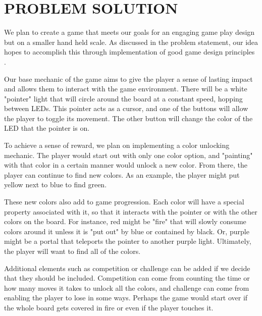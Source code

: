 \documentclass[12pt]{article}
\begin{document}
\section{PROBLEM SOLUTION}

We plan to create a game that meets our goals for an engaging game play design but on a smaller hand held scale. As discussed in the problem statement, our idea hopes to accomplish this through implementation of good game design principles \cite{designPrinciples}\cite{youtube}.

Our base mechanic of the game aims to give the player a sense of lasting impact and allows them to interact with the game environment. There will be a white "pointer" light that will circle around the board at a constant speed, hopping between LEDs. This pointer acts as a cursor, and one of the buttons will allow the player to toggle its movement. The other button will change the color of the LED that the pointer is on.

To achieve a sense of reward, we plan on implementing a color unlocking mechanic. The player would start out with only one color option, and "painting" with that color in a certain manner would unlock a new color. From there, the player can continue to find new colors. As an example, the player might put yellow next to blue to find green.

These new colors also add to game progression. Each color will have a special property associated with it, so that it interacts with the pointer or with the other colors on the board. For instance, red might be "fire" that will slowly consume colors around it unless it is "put out" by blue or contained by black. Or, purple might be a portal that teleports the pointer to another purple light. Ultimately, the player will want to find all of the colors.

Additional elements such as competition or challenge can be added if we decide that they should be included. Competition can come from counting the time or how many moves it takes to unlock all the colors, and challenge can come from enabling the player to lose in some ways. Perhaps the game would start over if the whole board gets covered in fire or even if the player touches it.
\end{document}
